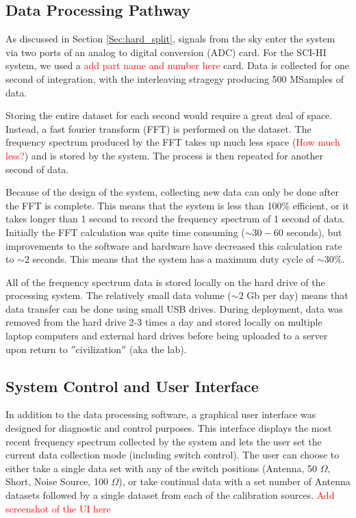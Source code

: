 \subsection{Data Processing Pathway}
As discussed in Section \ref{Sec:hard_split}, signals from the sky enter the system via two ports of an analog to digital conversion (ADC) card. For the SCI-HI system, we used a \textcolor{red}{add part name and number here} card. Data is collected for one second of integration, with the interleaving stragegy producing 500 MSamples of data. 

Storing the entire dataset for each second would require a great deal of space. Instead, a fast fourier transform (FFT) is performed on the dataset. The frequency spectrum produced by the FFT takes up much less space (\textcolor{red}{How much less?}) and is stored by the system. The process is then repeated for another second of data. 

Because of the design of the system, collecting new data can only be done after the FFT is complete. This means that the system is less than 100\% efficient, or it takes longer than 1 second to record the frequency spectrum of 1 second of data. Initially the FFT calculation was quite time consuming ($\sim 30-60$ seconds), but improvements to the software and hardware have decreased this calculation rate to $\sim 2$ seconds. This means that the system has a maximum duty cycle of $\sim30$\%. 

All of the frequency spectrum data is stored locally on the hard drive of the processing system. The relatively small data volume ($\sim 2$ Gb per day) means that data transfer can be done using small USB drives. During deployment, data was removed from the hard drive 2-3 times a day and stored locally on multiple laptop computers and external hard drives before being uploaded to a server upon return to $''$civilization$''$ (aka the lab). 

\subsection{System Control and User Interface}
In addition to the data processing software, a graphical user interface was designed for diagnostic and control purposes. This interface displays the most recent frequency spectrum collected by the system and lets the user set the current data collection mode (including switch control). The user can choose to either take a single data set with any of the switch positions (Antenna, 50 $\Omega$, Short, Noise Source, 100 $\Omega$), or take continual data with a set number of Antenna datasets followed by a single dataset from each of the calibration sources. \textcolor{red}{Add screenshot of the UI here}

